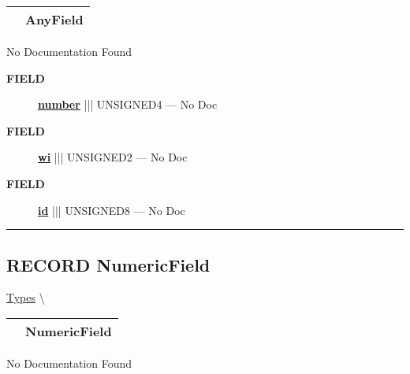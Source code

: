 {\renewcommand{\arraystretch}{1.5}
\begin{tabularx}{\textwidth}{|>{\raggedright\arraybackslash}l|X|}
\hline
\hspace{0pt}\mytexttt{\color{red} } & \textbf{AnyField} \\
\hline
\end{tabularx}
}

\par





No Documentation Found







\par
\begin{description}
\item [\colorbox{tagtype}{\color{white} \textbf{\textsf{FIELD}}}] \textbf{\underline{number}} ||| UNSIGNED4 --- No Doc
\item [\colorbox{tagtype}{\color{white} \textbf{\textsf{FIELD}}}] \textbf{\underline{wi}} ||| UNSIGNED2 --- No Doc
\item [\colorbox{tagtype}{\color{white} \textbf{\textsf{FIELD}}}] \textbf{\underline{id}} ||| UNSIGNED8 --- No Doc
\end{description}





\rule{\linewidth}{0.5pt}
\subsection*{\textsf{\colorbox{headtoc}{\color{white} RECORD}
NumericField}}

\hypertarget{ecldoc:ml_core.types.numericfield}{}
\hspace{0pt} \hyperlink{ecldoc:ML_Core.Types}{Types} \textbackslash 

{\renewcommand{\arraystretch}{1.5}
\begin{tabularx}{\textwidth}{|>{\raggedright\arraybackslash}l|X|}
\hline
\hspace{0pt}\mytexttt{\color{red} } & \textbf{NumericField} \\
\hline
\end{tabularx}
}

\par





No Documentation Found







